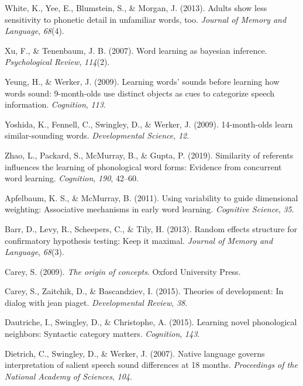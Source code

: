 \documentclass[english,,man]{apa6}
\begin{document}
\leavevmode\hypertarget{ref-white2013}{}%
White, K., Yee, E., Blumstein, S., \& Morgan, J. (2013). Adults show less sensitivity to phonetic detail in unfamiliar words, too. \emph{Journal of Memory and Language}, \emph{68}(4).

\leavevmode\hypertarget{ref-xu2007}{}%
Xu, F., \& Tenenbaum, J. B. (2007). Word learning as bayesian inference. \emph{Psychological Review}, \emph{114}(2).

\leavevmode\hypertarget{ref-yeung09}{}%
Yeung, H., \& Werker, J. (2009). Learning words' sounds before learning how words sound: 9-month-olds use distinct objects as cues to categorize speech information. \emph{Cognition}, \emph{113}.

\leavevmode\hypertarget{ref-yoshida2009}{}%
Yoshida, K., Fennell, C., Swingley, D., \& Werker, J. (2009). 14-month-olds learn similar-sounding words. \emph{Developmental Science}, \emph{12}.

\leavevmode\hypertarget{ref-Zhao2019}{}%
Zhao, L., Packard, S., McMurray, B., \& Gupta, P. (2019). Similarity of referents influences the learning of phonological word forms: Evidence from concurrent word learning. \emph{Cognition}, \emph{190}, 42--60.

\leavevmode\hypertarget{ref-apfelbaum2011}{}%
Apfelbaum, K. S., \& McMurray, B. (2011). Using variability to guide dimensional weighting: Associative mechanisms in early word learning. \emph{Cognitive Science}, \emph{35}.

\leavevmode\hypertarget{ref-barr2013}{}%
Barr, D., Levy, R., Scheepers, C., \& Tily, H. (2013). Random effects structure for confirmatory hypothesis testing: Keep it maximal. \emph{Journal of Memory and Language}, \emph{68}(3).

\leavevmode\hypertarget{ref-carey2009}{}%
Carey, S. (2009). \emph{The origin of concepts}. Oxford University Press.

\leavevmode\hypertarget{ref-carey2015}{}%
Carey, S., Zaitchik, D., \& Bascandziev, I. (2015). Theories of development: In dialog with jean piaget. \emph{Developmental Review}, \emph{38}.

\leavevmode\hypertarget{ref-dautriche2015}{}%
Dautriche, I., Swingley, D., \& Christophe, A. (2015). Learning novel phonological neighbors: Syntactic category matters. \emph{Cognition}, \emph{143}.

\leavevmode\hypertarget{ref-dietrich2007}{}%
Dietrich, C., Swingley, D., \& Werker, J. (2007). Native language governs interpretation of salient speech sound differences at 18 months. \emph{Proceedings of the National Academy of Sciences}, \emph{104}.
\end{document}
